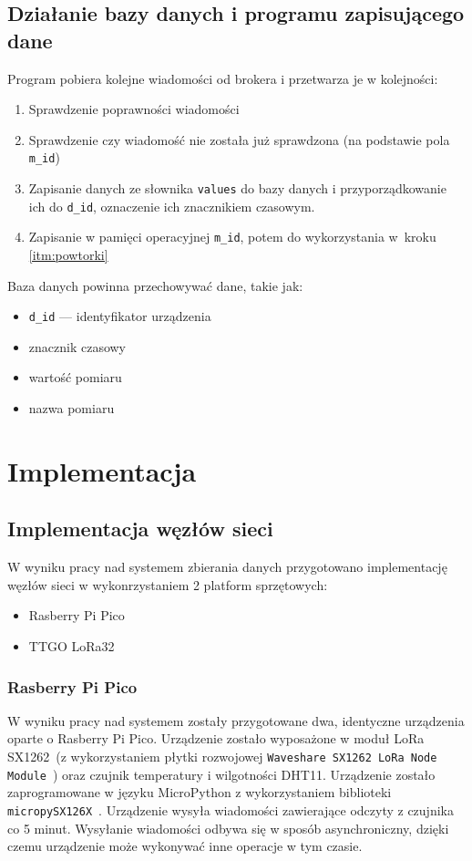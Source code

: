 \subsection{Działanie bazy danych i programu zapisującego dane}
Program pobiera kolejne wiadomości od brokera i przetwarza je w kolejności:
\begin{enumerate}
    \item Sprawdzenie poprawności wiadomości
    \item \label{itm:powtorki} Sprawdzenie czy wiadomość nie została już sprawdzona (na podstawie pola \texttt{m\_id})
    \item Zapisanie danych ze słownika \texttt{values} do bazy danych i przyporządkowanie ich do \texttt{d\_id}, oznaczenie ich znacznikiem czasowym.
    \item Zapisanie w pamięci operacyjnej \texttt{m\_id}, potem do wykorzystania w~kroku \ref{itm:powtorki}
\end{enumerate}
Baza danych powinna przechowywać dane, takie jak:
\begin{itemize}
    \item \texttt{d\_id} — identyfikator urządzenia
    \item znacznik czasowy
    \item wartość pomiaru
    \item nazwa pomiaru
\end{itemize}

\section{Implementacja}
\subsection{Implementacja węzłów sieci}
W wyniku pracy nad systemem zbierania danych przygotowano implementację węzłów sieci w wykonrzystaniem 2 platform sprzętowych:
\begin{itemize}
    \item Rasberry Pi Pico
    \item TTGO LoRa32
\end{itemize}

\subsubsection{Rasberry Pi Pico}
W wyniku pracy nad systemem zostały przygotowane dwa, identyczne urządzenia oparte o Rasberry Pi Pico. Urządzenie zostało wyposażone w moduł LoRa SX1262~\cite{PICO:sx1262-doc}(z wykorzystaniem płytki rozwojowej \texttt{Waveshare SX1262 LoRa Node Module}~\cite{PICO:waveshare-doc}) oraz czujnik temperatury i wilgotności DHT11. Urządzenie zostało zaprogramowane w języku MicroPython z wykorzystaniem biblioteki \texttt{micropySX126X}~\cite{PICO:lora-lib}. Urządzenie wysyła wiadomości zawierające odczyty z czujnika co 5 minut. Wysyłanie wiadomości odbywa się w sposób asynchroniczny, dzięki czemu urządzenie może wykonywać inne operacje w tym czasie.

